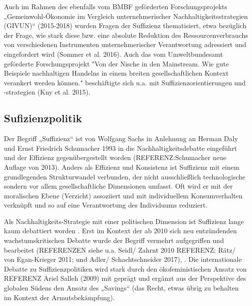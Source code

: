 \documentclass[a4paper,11pt,twoside]{scrartcl}
\begin{document}
Auch im Rahmen des ebenfalls vom BMBF geförderten Forschungsprojekts „Gemeinwohl-Ökonomie im Vergleich unternehmerischer Nachhaltigkeitsstrategien (GIVUN)“ (2015-2018) wurden Fragen der Suffizienz thematisiert, etwa bezüglich der Frage, wie stark diese bzw. eine absolute Reduktion des Ressourcenverbrauchs von verschiedenen Instrumenten unternehmerischer Verantwortung adressiert und eingefordert wird (Sommer et al. 2016). Auch das vom Umweltbundesamt geförderte Forschungsprojekt "Von der Nische in den Mainstream. Wie gute Beispiele nachhaltigen Handelns in einem breiten gesellschaftlichen Kontext verankert werden können." beschäftigte sich u.a. mit Suffizienzorientierungen und -strategien (Kny et al. 2015).
    
\subsection*{Sufizienzpolitik}
Der Begriff „Suffizienz“ ist von Wolfgang Sachs in Anlehnung an Herman Daly und Ernst Friedrich Schumacher 1993 in die Nachhaltigkeitsdebatte eingeführt und der Effizienz gegenübergestellt worden \cite{Sachs1993,Daly1991} (REFERENZ:Schumacher neue Auflage von 2013). Anders als Effizienz und Konsistenz ist Suffizienz mit einem grundlegenden Strukturwandel verbunden, der nicht ausschließlich technologische sondern vor allem gesellschaftliche Dimensionen umfasst. Oft wird er mit der moralischen Ebene (Verzicht) assoziiert und mit individuellem Konsumverhalten verknüpft und so auf eine Verantwortung des Individuums reduziert.

Als Nachhaltigkeits-Strategie mit einer politischen Dimension ist Suffizienz lange kaum debattiert worden \cite{Winterfeld 2002}.  Erst im Kontext der ab 2010 sich neu entzündenden wachstumskritischen Debatte wurde der Begriff vermehrt aufgegriffen und bearbeitet (REFERENZEN siehe u.a. Seidl/ Zahrnt 2010 REFERENZ; Rätz/ von Egan-Krieger 2011; und Adler/ Schachtschneider 2017), \cite{Schneidewind2013,Winterfeld2017,Linz2015,Bierwirth2015,Thomas2015}. Die internationale Debatte zu Suffizienzpolitiken wird stark durch den ökofeministischen Ansatz von REFERENZ Ariel Salleh (2009) mit geprägt und ergänzt aus der Perspektive des globalen Südens den Ansatz des „Savings“ (das Recht, etwas übrig zu behalten im Kontext der Armutsbekämpfung).
\end{document}
